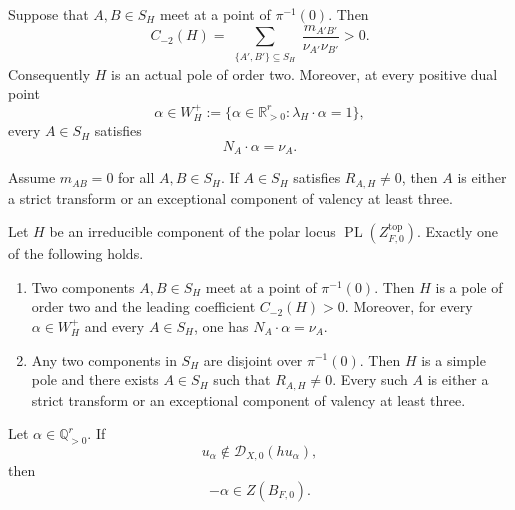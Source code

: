 \documentclass[10pt,a4paper]{amsart}
\DeclareMathOperator{\PL}{PL}
\newcommand{\D}{\mathscr D}
\newcommand{\Q}{\mathbb Q}
\newcommand{\R}{\mathbb R}
\begin{document}
\begin{theorem}
\label{thm:same-wall-positivity}
Suppose that $A,B\in S_H$ meet at a point of $\pi^{-1}(0)$. Then
\begin{equation}\label{eq:positive-double-coefficient}
    C_{-2}(H) = \sum_{\substack{\{A',B'\}\subseteq S_H}}\frac{m_{A'B'}}{\nu_{A'}\nu_{B'}}>0.
\end{equation}
Consequently $H$ is an actual pole of order two. Moreover, at every positive dual point
\begin{equation}\label{eq:positive-dual-wall}
    \alpha\in W_H^+ := \{\alpha\in\R_{>0}^r:\lambda_H\cdot\alpha=1\},
\end{equation}
every $A\in S_H$ satisfies 
\begin{equation} \label{eq:same-wall-zero-index}
N_A\cdot\alpha=\nu_A.
\end{equation}

\end{theorem}

\begin{theorem}\label{thm:selected-component-classification}
Assume $m_{AB}=0$ for all $A, B\in S_H$. If $A\in S_H$ satisfies $R_{A,H}\neq 0$, then $A$ is either a strict transform or an exceptional component of valency at least three. 
\end{theorem}

\begin{theorem}\label{thm:grouped-wall-dichotomy} 
Let $H$ be an irreducible component of the polar locus $\PL(Z^{\mathrm{top}}_{F,0})$. Exactly one of the following holds.
\begin{enumerate}[label=\textup{(\roman*)}]
\item Two components $A,B\in S_H$ meet at a point of $\pi^{-1}(0)$. Then $H$ is a pole of order two and the leading coefficient $C_{-2}(H)>0$. Moreover, for every $\alpha\in W_H^+$ and every $A\in S_H$, one has $N_A\cdot\alpha=\nu_A$.
\item Any two components in $S_H$ are disjoint over $\pi^{-1}(0)$. Then $H$ is a simple pole and there exists $A\in S_H$ such that $R_{A,H}\neq0$. Every such $A$ is either a strict transform or an exceptional component of valency at least three.
\end{enumerate}
\end{theorem}

\begin{proposition}\label{prop:affine-point-lifting}
Let $\alpha\in\Q_{>0}^r$. If
\begin{equation}\label{eq:cyclic-noncontainment}
 u_\alpha\notin\D_{X,0}(hu_\alpha),
\end{equation}
then
\begin{equation}\label{eq:point-in-bernstein-zero-set}
 -\alpha\in Z(B_{F,0}).
\end{equation}
\end{proposition}
\end{document}
